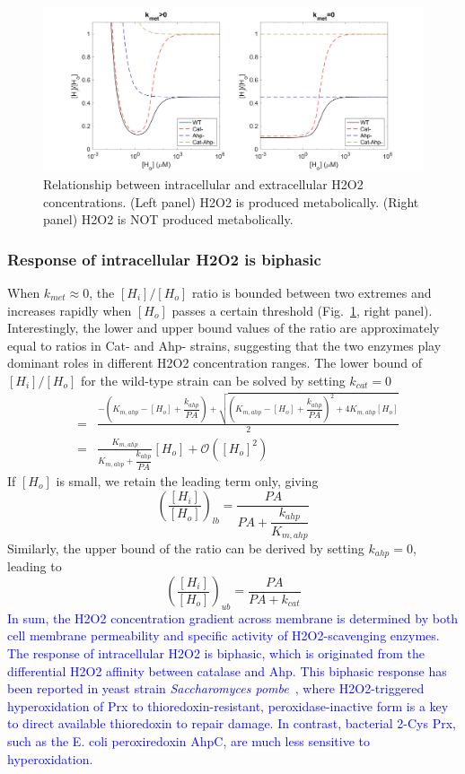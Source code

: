 \documentclass[11pt]{article}
\newcommand{\clblue}[1]{\textcolor{blue}{#1}}
\begin{document}
\begin{figure}[h!]
\centering
  \includegraphics[width=1\linewidth]{HoHi_ratio_mutants.png}
  \caption{Relationship between intracellular and extracellular H2O2 concentrations. (Left panel) H2O2 is produced metabolically. (Right panel) H2O2 is NOT produced metabolically.}
  \label{fig:rHoHi}
\end{figure}

\subsubsection{Response of intracellular H2O2 is biphasic}

When $k_{met}\approx 0$, the $[H_i]/[H_o]$ ratio is bounded between two extremes and increases rapidly when $[H_o]$ passes a certain threshold (Fig.~\ref{fig:rHoHi}, right panel). Interestingly, the lower and upper bound values of the ratio are approximately equal to ratios in Cat- and Ahp- strains, suggesting that the two enzymes play dominant roles in different H2O2 concentration ranges. The lower bound of $[H_i]/[H_o]$ for the wild-type strain can be solved by setting $k_{cat}=0$
\begin{eqnarray}
[H_i] &=& \frac{-\left(K_{m,ahp}-[H_o]+\dfrac{k_{ahp}}{PA}\right)+\sqrt{\left(K_{m,ahp}-[H_o]+\dfrac{k_{ahp}}{PA}\right)^2+4K_{m,ahp}[H_o]}}{2} \\
&=& \frac{K_{m,ahp}}{K_{m,ahp}+\dfrac{k_{ahp}}{PA}}[H_o] + \mathcal{O}([H_o]^2)
\end{eqnarray}
If $[H_o]$ is small, we retain the leading term only, giving
\begin{equation}
\left(\frac{[H_i]}{[H_o]}\right)_{lb} = \dfrac{PA}{PA+\dfrac{k_{ahp}}{K_{m,ahp}}}
\end{equation}
Similarly, the upper bound of the ratio can be derived by setting $k_{ahp}=0$, leading to
\begin{equation}
\left(\frac{[H_i]}{[H_o]}\right)_{ub} = \frac{PA}{PA+k_{cat}}
\end{equation}
\clblue{In sum, the H2O2 concentration gradient across membrane is determined by both cell membrane permeability and specific activity of H2O2-scavenging enzymes. The response of intracellular H2O2 is biphasic, which is originated from the differential H2O2 affinity between catalase and Ahp. This biphasic response has been reported in yeast strain \textit{Saccharomyces pombe}~\cite{tomalin2016increasing}, where H2O2-triggered hyperoxidation of Prx to thioredoxin-resistant, peroxidase-inactive form is a key to direct available thioredoxin to repair damage. In contrast, bacterial 2-Cys Prx, such as the E. coli peroxiredoxin AhpC, are
much less sensitive to hyperoxidation.}
\end{document}
